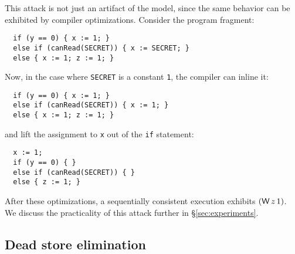 This attack is not just an artifact of the model,
since the same behavior can be exhibited by
compiler optimizations. Consider the program fragment:
\begin{verbatim}
  if (y == 0) { x := 1; }
  else if (canRead(SECRET)) { x := SECRET; }
  else { x := 1; z := 1; }
\end{verbatim}
Now, in the case where \verb|SECRET| is a constant \verb|1|,
the compiler can inline it:
\begin{verbatim}
  if (y == 0) { x := 1; }
  else if (canRead(SECRET)) { x := 1; }
  else { x := 1; z := 1; }
\end{verbatim}
and lift the assignment to \verb|x| out of the \verb|if| statement:
\begin{verbatim}
  x := 1;
  if (y == 0) { }
  else if (canRead(SECRET)) { }
  else { z := 1; }
\end{verbatim}
After these optimizations, a sequentially consistent execution
exhibits $(\DW{z}{1})$. We discuss the practicality of this attack
further in \S\ref{sec:experiments}.

\subsection{Dead store elimination}
\label{sec:dse}

